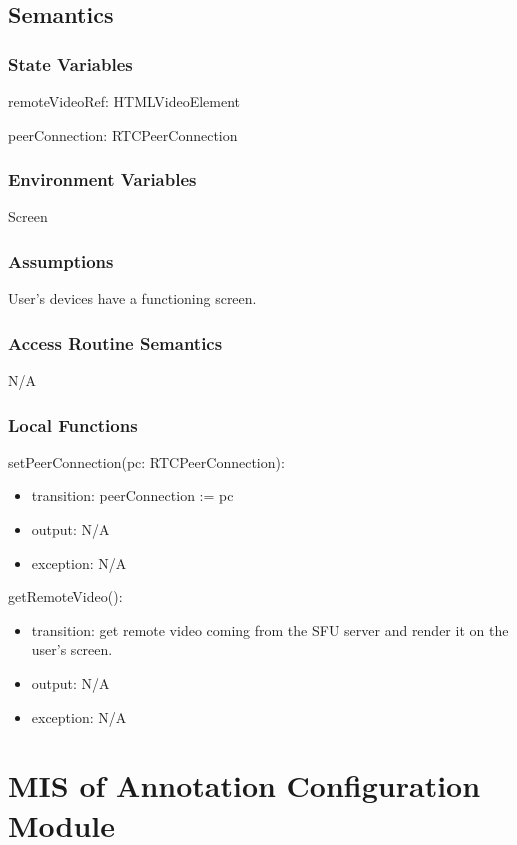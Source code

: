\documentclass[12pt, titlepage]{article}
\begin{document}
\subsection{Semantics}

\subsubsection{State Variables}

\noindent remoteVideoRef: HTMLVideoElement

\noindent peerConnection: RTCPeerConnection

\subsubsection{Environment Variables}

\noindent Screen

\subsubsection{Assumptions}

User's devices have a functioning screen.

\subsubsection{Access Routine Semantics}

N/A

\subsubsection{Local Functions}

\noindent setPeerConnection(pc: RTCPeerConnection):
\begin{itemize}
\item transition: peerConnection := pc
\item output: N/A
\item exception: N/A
\end{itemize}

\noindent getRemoteVideo():
\begin{itemize}
\item transition: get remote video coming from the SFU server and render it on the
  user's screen.
\item output: N/A
\item exception: N/A
\end{itemize}


\section{MIS of Annotation Configuration Module} \label{sec:annoconfig}
\end{document}
